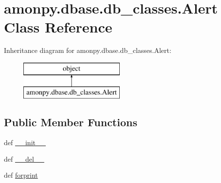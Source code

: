 \hypertarget{classamonpy_1_1dbase_1_1db__classes_1_1_alert}{\section{amonpy.\-dbase.\-db\-\_\-classes.\-Alert Class Reference}
\label{classamonpy_1_1dbase_1_1db__classes_1_1_alert}
}
Inheritance diagram for amonpy.\-dbase.\-db\-\_\-classes.\-Alert\-:\begin{figure}[H]
\begin{center}
\leavevmode
\includegraphics[height=2.000000cm]{classamonpy_1_1dbase_1_1db__classes_1_1_alert}
\end{center}
\end{figure}
\subsection*{Public Member Functions}
\begin{DoxyCompactItemize}
\item 
def \hyperlink{classamonpy_1_1dbase_1_1db__classes_1_1_alert_a50431e4196730d79202edbf8254a0bb8}{\-\_\-\-\_\-init\-\_\-\-\_\-}
\item 
def \hyperlink{classamonpy_1_1dbase_1_1db__classes_1_1_alert_a476ccdad5f6aa02bc76665f8a95160a2}{\-\_\-\-\_\-del\-\_\-\-\_\-}
\item 
def \hyperlink{classamonpy_1_1dbase_1_1db__classes_1_1_alert_a29c8eebc5f01603bdba8469547c0940d}{forprint}
\end{DoxyCompactItemize}
